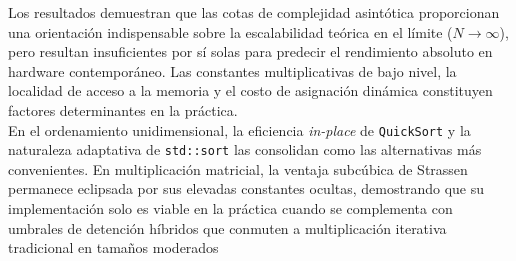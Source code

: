 Los resultados demuestran que las cotas de complejidad asintótica proporcionan una orientación indispensable sobre la escalabilidad teórica en el límite ($N \to \infty$), pero resultan insuficientes por sí solas para predecir el rendimiento absoluto en hardware contemporáneo. Las constantes multiplicativas de bajo nivel, la localidad de acceso a la memoria y el costo de asignación dinámica constituyen factores determinantes en la práctica.\\
En el ordenamiento unidimensional, la eficiencia \textit{in-place} de \texttt{QuickSort} y la naturaleza adaptativa de \texttt{std::sort} las consolidan como las alternativas más convenientes. En multiplicación matricial, la ventaja subcúbica de Strassen permanece eclipsada por sus elevadas constantes ocultas, demostrando que su implementación solo es viable en la práctica cuando se complementa con umbrales de detención híbridos que conmuten a multiplicación iterativa tradicional en tamaños moderados